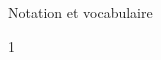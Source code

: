 \documentclass[a4paper,11pt]{report}
\begin{document}
\begin{resolu}{Notation et vocabulaire}
{\begin{center}
\end{center}
}
{1}
\end{resolu}

\end{document}
